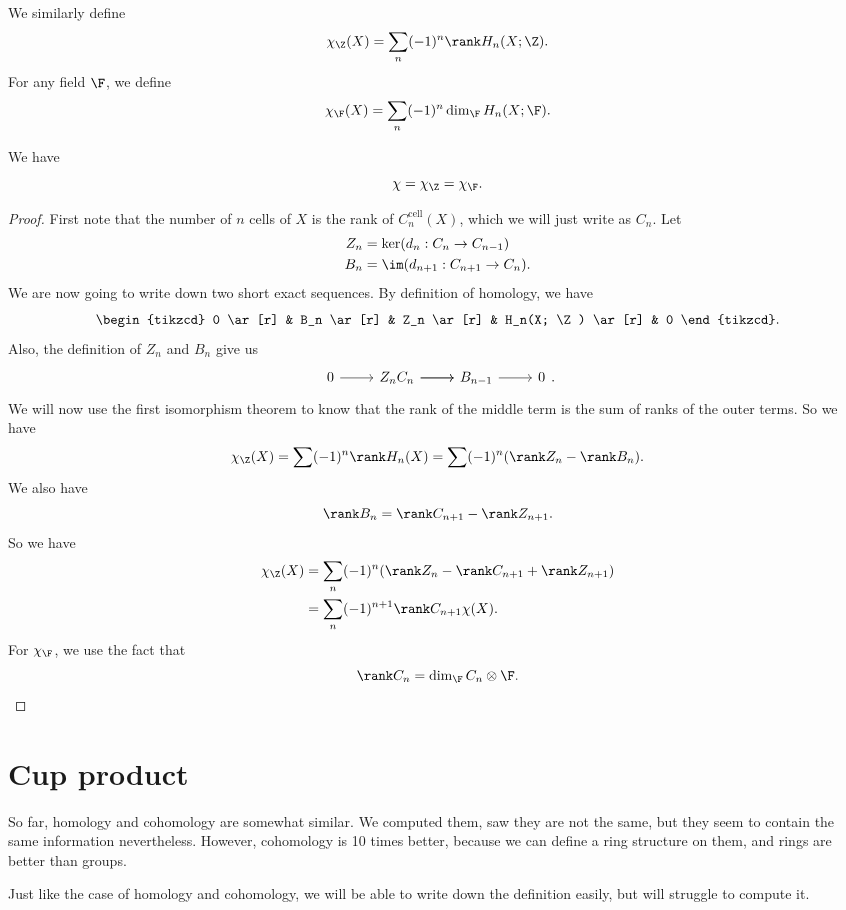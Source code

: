 \documentclass[a4paper]{article}
\begin{document}
We similarly define
\[
  \chi_{\Z}(X) = \sum_n (-1)^n \rank H_n(X; \Z).
\]
For any field $\F$, we define
\[
  \chi_{\F}(X) = \sum_n (-1)^n \dim_\F H_n(X; \F).
\]
\begin{thm}
  We have
  \[
    \chi = \chi_\Z = \chi_\F.
  \]
\end{thm}

\begin{proof}
  First note that the number of $n$ cells of $X$ is the rank of $C_n^{\mathrm{cell}}(X)$, which we will just write as $C_n$. Let
  \begin{align*}
    Z_n &= \ker (d_n: C_n \to C_{n - 1})\\
    B_n &= \im (d_{n + 1}: C_{n + 1} \to C_n).
  \end{align*}
  We are now going to write down two short exact sequences. By definition of homology, we have
  \[
    \begin{tikzcd}
      0 \ar[r] & B_n \ar[r] & Z_n \ar[r] & H_n(X; \Z) \ar[r] & 0
    \end{tikzcd}.
  \]
  Also, the definition of $Z_n$ and $B_n$ give us
  \[
    \begin{tikzcd}
      0 \ar[r] & Z_n \ar[r] C_n \ar[r] & B_{n - 1} \ar[r] & 0
    \end{tikzcd}.
  \]
  We will now use the first isomorphism theorem to know that the rank of the middle term is the sum of ranks of the outer terms. So we have
  \[
    \chi_\Z(X) = \sum (-1)^n \rank H_n(X) = \sum(-1)^n (\rank Z_n - \rank B_n).
  \]
  We also have
  \[
    \rank B_n = \rank C_{n + 1} - \rank Z_{n + 1}.
  \]
  So we have
  \begin{align*}
    \chi_\Z(X) &= \sum_n (-1)^n (\rank Z_n - \rank C_{n + 1} + \rank Z_{n + 1}) \\
    &= \sum_n (-1)^{n + 1} \rank C_{n + 1} \chi(X).
  \end{align*}
  For $\chi_\F$, we use the fact that
  \[
    \rank C_n = \dim_{\F} C_n \otimes \F.
  \]
\end{proof}
\section{Cup product}
So far, homology and cohomology are somewhat similar. We computed them, saw they are not the same, but they seem to contain the same information nevertheless. However, cohomology is 10 times better, because we can define a ring structure on them, and rings are better than groups.

Just like the case of homology and cohomology, we will be able to write down the definition easily, but will struggle to compute it.
\end{document}

